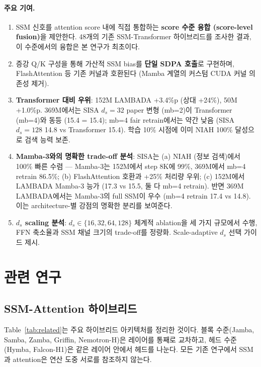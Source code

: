 \documentclass[11pt]{article}
\begin{document}
\paragraph{주요 기여.}
\begin{enumerate}[leftmargin=*]
\item SSM 신호를 attention score 내에 직접 통합하는 \textbf{score 수준 융합 (score-level fusion)}을 제안한다. 48개의 기존 SSM-Transformer 하이브리드를 조사한 결과, 이 수준에서의 융합은 본 연구가 최초이다.
\item 증강 Q/K 구성을 통해 가산적 SSM bias를 \textbf{단일 SDPA 호출}로 구현하며, FlashAttention 등 기존 커널과 호환된다 (Mamba 계열의 커스텀 CUDA 커널 의존성 제거).
\item \textbf{Transformer 대비 우위}: 152M LAMBADA +3.4\%p (상대 +24\%), 50M +1.0\%p. 369M에서는 SISA $d_s=32$ paper 변형 (mb=2)이 Transformer (mb=4)와 동등 (15.4 = 15.4); mb=4 fair retrain에서는 약간 낮음 (SISA $d_s=128$ 14.8 vs Transformer 15.4). 학습 10\% 시점에 이미 NIAH 100\% 달성으로 검색 능력 보존.
\item \textbf{Mamba-3와의 명확한 trade-off 분석}: SISA는 (a) NIAH (정보 검색)에서 100\% 빠른 수렴 — Mamba-3는 152M에서 step 8K에 99\%, 369M에서 mb=4 retrain 86.5\%; (b) FlashAttention 호환과 +25\% 처리량 우위; (c) 152M에서 LAMBADA Mamba-3 능가 (17.3 vs 15.5, 둘 다 mb=4 retrain). 반면 369M LAMBADA에서는 Mamba-3의 full SSM이 우수 (mb=4 retrain 17.4 vs 14.8). 이는 architecture-별 강점의 명확한 분리를 보여준다.
\item \textbf{$d_s$ scaling 분석}: $d_s \in \{16, 32, 64, 128\}$ 체계적 ablation을 세 가지 규모에서 수행, FFN 축소율과 SSM 채널 크기의 trade-off를 정량화. Scale-adaptive $d_s$ 선택 가이드 제시.
\end{enumerate}

\section{관련 연구}

\subsection{SSM-Attention 하이브리드}

Table~\ref{tab:related}는 주요 하이브리드 아키텍처를 정리한 것이다. 블록 수준(Jamba, Samba, Zamba, Griffin, Nemotron-H)은 레이어를 통째로 교차하고, 헤드 수준(Hymba, Falcon-H1)은 같은 레이어 안에서 헤드를 나눈다. 모든 기존 연구에서 SSM과 attention은 연산 도중 서로를 참조하지 않는다.
\end{document}
